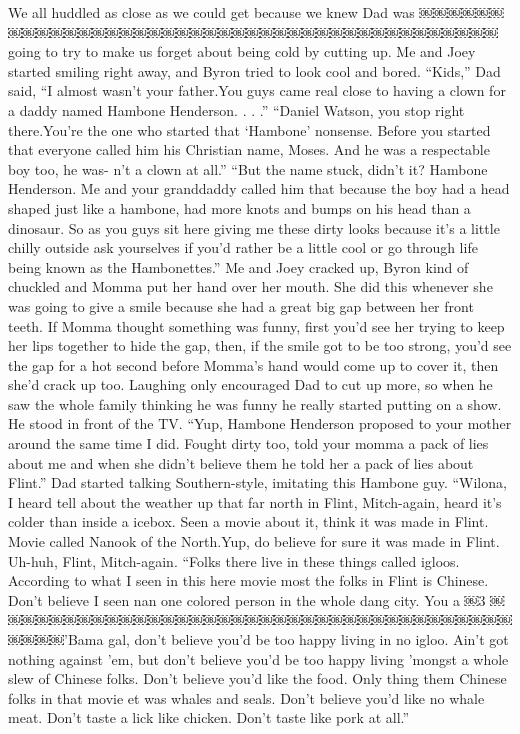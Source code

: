 \documentclass{standard}
\begin{document}
We all huddled as close as we could get because we knew Dad was ￼￼￼￼￼￼￼￼￼￼￼￼￼￼￼￼￼￼￼￼￼￼￼￼￼￼￼￼￼￼￼￼￼￼￼￼￼￼￼￼￼going to try to make us forget about being cold by cutting up. Me and Joey started smiling right away, and Byron tried to look cool and bored.
“Kids,” Dad said, “I almost wasn’t your father.You guys came real close to having a clown for a daddy named Hambone Henderson. . . .” “Daniel Watson, you stop right there.You’re the one who started that ‘Hambone’ nonsense. Before you started that everyone called him his Christian name, Moses. And he was a respectable boy too, he was-
n’t a clown at all.”
“But the name stuck, didn’t it? Hambone Henderson. Me and your
granddaddy called him that because the boy had a head shaped just like a hambone, had more knots and bumps on his head than a dinosaur. So as you guys sit here giving me these dirty looks because it’s a little chilly outside ask yourselves if you’d rather be a little cool or go through life being known as the Hambonettes.”
Me and Joey cracked up, Byron kind of chuckled and Momma put her hand over her mouth. She did this whenever she was going to give a smile because she had a great big gap between her front teeth. If Momma thought something was funny, first you’d see her trying to keep her lips together to hide the gap, then, if the smile got to be too strong, you’d see the gap for a hot second before Momma’s hand would come up to cover it, then she’d crack up too.
Laughing only encouraged Dad to cut up more, so when he saw the whole family thinking he was funny he really started putting on a show.
He stood in front of the TV. “Yup, Hambone Henderson proposed to your mother around the same time I did. Fought dirty too, told your momma a pack of lies about me and when she didn’t believe them he told her a pack of lies about Flint.”
Dad started talking Southern-style, imitating this Hambone guy. “Wilona, I heard tell about the weather up that far north in Flint, Mitch-again, heard it’s colder than inside a icebox. Seen a movie about it, think it was made in Flint. Movie called Nanook of the North.Yup, do believe for sure it was made in Flint. Uh-huh, Flint, Mitch-again.
“Folks there live in these things called igloos. According to what I seen in this here movie most the folks in Flint is Chinese. Don’t believe I seen nan one colored person in the whole dang city. You a
￼3
￼￼￼￼￼￼￼￼￼￼￼￼￼￼￼￼￼￼￼￼￼￼￼￼￼￼￼￼￼￼￼￼￼￼￼￼￼￼￼￼￼’Bama gal, don’t believe you’d be too happy living in no igloo. Ain’t got nothing against ’em, but don’t believe you’d be too happy living ’mongst a whole slew of Chinese folks. Don’t believe you’d like the food. Only thing them Chinese folks in that movie et was whales and seals. Don’t believe you’d like no whale meat. Don’t taste a lick like chicken. Don’t taste like pork at all.”
\end{document}

